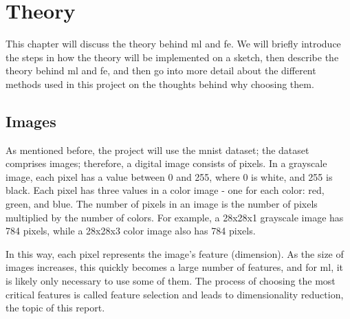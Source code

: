 \chapter{Theory}\label{cha:theory}
This chapter will discuss the theory behind \gls{ml} and \gls{fe}. We will briefly introduce the steps in how the theory will be implemented on a sketch, then describe the theory behind \gls{ml} and \gls{fe}, and then go into more detail about the different methods used in this project on the thoughts behind why choosing them.

\section{Images}\label{sec:images}
As mentioned before, the project will use the \gls{mnist} dataset; the dataset comprises images; therefore, a digital image consists of pixels. In a grayscale image, each pixel has a value between 0 and 255, where 0 is white, and 255 is black. Each pixel has three values in a color image - one for each color: red, green, and blue. The number of pixels in an image is the number of pixels multiplied by the number of colors. For example, a 28x28x1 grayscale image has 784 pixels, while a 28x28x3 color image also has 784 pixels.

In this way, each pixel represents the image's feature (dimension). As the size of images increases, this quickly becomes a large number of features, and for \gls{ml}, it is likely only necessary to use some of them. The process of choosing the most critical features is called feature selection and leads to dimensionality reduction, the topic of this report.



